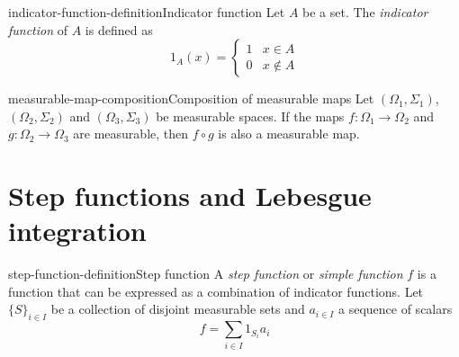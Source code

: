 \documentclass[preview]{standalone}
\begin{document}

\begin{snippetdefinition}{indicator-function-definition}{Indicator function}
    Let \(A\) be a set.
    The \textit{indicator function} of \(A\) is defined as
    \[
        1_{A}(x) = \begin{cases}
            1 & x \in A \\
            0 & x \notin A
        \end{cases}
    \]
\end{snippetdefinition}


\begin{snippetproposition}{measurable-map-composition}{Composition of measurable maps}
    Let \((\Omega_1, \Sigma_1)\), \((\Omega_2, \Sigma_2)\) and \((\Omega_3, \Sigma_3)\)
    be measurable spaces.
    If the maps \(f\colon \Omega_1 \to \Omega_2\) and \(g\colon \Omega_2 \to \Omega_3\)
    are measurable, then \(f \circ g\) is also a measurable map.
\end{snippetproposition}


\section{Step functions and Lebesgue integration}

\begin{snippetdefinition}{step-function-definition}{Step function}
    A \textit{step function} or \textit{simple function} \(f\) is a function that can be
    expressed as a combination of indicator functions.
    Let \(\{S\}_{i \in I}\) be a collection of disjoint measurable sets and \(a_{i \in I}\) a sequence of scalars
    \[
        f = \sum_{i \in I} 1_{S_i} a_i
    \]
\end{snippetdefinition}

\end{document}
